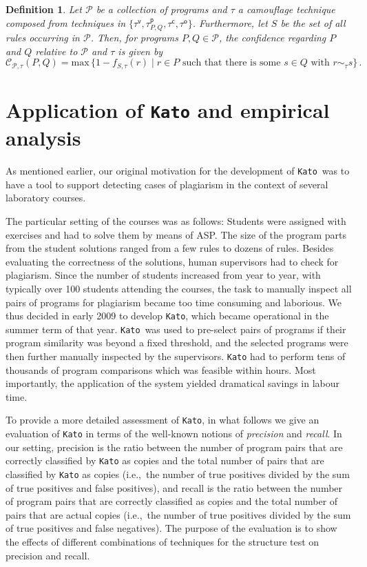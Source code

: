\documentclass{tlp}
\newcommand{\camouv}{\tau^\mathsf{v}}
\newcommand{\camoup}{\tau^\mathsf{p}}
\newcommand{\camouc}{\tau^\mathsf{c}}
\newcommand{\camouo}{\tau^\mathsf{o}}
\newcommand{\iec}[0]{i.e.,\ }
\newcommand{\kato}[0]{\texttt{Kato}\xspace}
\renewcommand{\max}[1]{\mathrm{max}\,{#1}}
\newcommand{\conf}[4]{\mathcal{C}_{{#1},{#2}}({#3},{#4})}
\newtheorem{definition}{Definition}
\begin{document}
\begin{definition}\label{def:confidence}
Let $\mathcal{P}$ be a collection of programs and $\tau$ a camouflage technique   composed from techniques in $\{\camouv, \camoup_{P,Q}, \camouc, \camouo\}$.
Furthermore, let $S$ be the set of all rules occurring in $\mathcal{P}$.
Then, for programs $P, Q \in \mathcal{P}$,
the \emph{confidence regarding $P$ and $Q$ relative to $\mathcal{P}$ and $\tau$} is given by
\[
\conf{\mathcal{P}}{\tau}{P}{Q} = \max{\{1 - f_{S,\tau}(r) \mid r \in P\mbox{ such that there is some $s \in Q$ with } r \sim_{\tau} s} \}\,.
\]
\end{definition}

\section{Application of \kato and empirical analysis}\label{sec:eval}


As mentioned earlier, our original motivation for the development of \kato\ was to have a tool to support detecting cases of plagiarism in the context of several laboratory courses.

The particular setting of the courses was as follows:
Students were assigned with exercises and had to solve them 
 by means of ASP. The size of the program parts from the student solutions ranged from a few rules to dozens of rules.
Besides evaluating the correctness of the solutions, human supervisors had
to check for plagiarism. 
Since the number of students increased from year to year, with typically over 100 students attending the courses, 
the task to manually inspect all pairs of programs for plagiarism became too time consuming and laborious.
We thus decided in early 2009 to develop \kato, which became 
operational in the summer term of that year.
 \kato\ was used to pre-select pairs of programs if their program similarity was beyond a fixed threshold, and the selected programs were then further manually inspected by the supervisors. 
\kato had to perform tens of thousands of program comparisons 
which was feasible within 
hours.
Most importantly, the application of the system yielded dramatical savings in labour time.

To provide a more detailed assessment of \kato, 
in what follows we give an evaluation of \kato in terms of the well-known notions of  \emph{precision} and \emph{recall}.
In our setting,
precision is the ratio between the number of program pairs that are correctly classified by \kato as copies 
and the total number of 
pairs that are classified by \kato as copies (\iec the number of true positives divided by the sum of true positives and false positives), and
recall is the ratio between the number of program pairs that are correctly classified as copies and the total number of pairs that are 
actual copies (\iec the number of true positives divided by the sum of true positives and false negatives).
The purpose of the evaluation is to show the effects of different combinations of techniques for the structure test on precision and recall.
\end{document}
